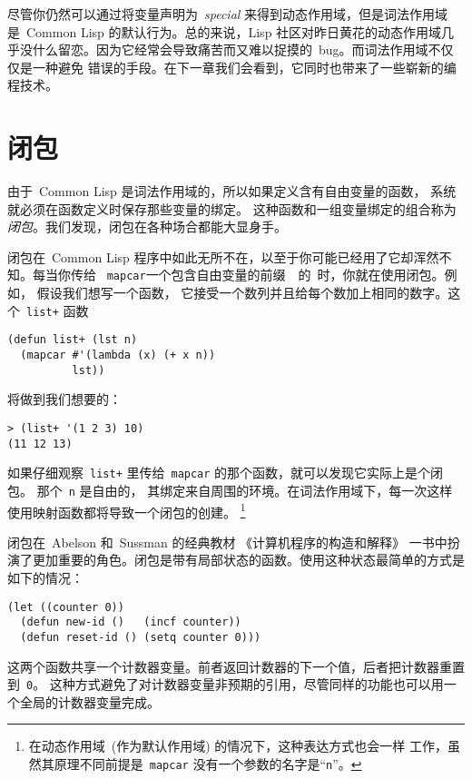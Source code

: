 尽管你仍然可以通过将变量声明为~\emph{special}
来得到动态作用域，但是词法作用域是~Common Lisp 的默认行为。总的来说，Lisp 社区对昨日黄花的动态作用域几乎没什么留恋。因为它经常会导致痛苦而又难以捉摸的~bug。而词法作用域不仅仅是一种避免
错误的手段。在下一章我们会看到，它同时也带来了一些崭新的编程技术。

\section{闭包}
\label{sec:closures}

由于~Common Lisp 是词法作用域的，所以如果定义含有自由变量的函数，
系统就必须在函数定义时保存那些变量的绑定。
这种函数和一组变量绑定的组合称为\emph{闭包}。我们发现，闭包在各种场合都能大显身手。

闭包在~Common Lisp 程序中如此无所不在，以至于你可能已经用了它却浑然不知。每当你传给
~\texttt{mapcar}一个包含自由变量的前缀~\sq~的~\lexpr 时，你就在使用闭包。例如，
假设我们想写一个函数，
它接受一个数列并且给每个数加上相同的数字。这个~\texttt{list+} 函数
\begin{lstlisting}
(defun list+ (lst n)
  (mapcar #'(lambda (x) (+ x n))
          lst))
\end{lstlisting}
将做到我们想要的：
\begin{lstlisting}
> (list+ '(1 2 3) 10)
(11 12 13)
\end{lstlisting}
如果仔细观察~\texttt{list+} 里传给~\texttt{mapcar} 的那个函数，就可以发现它实际上是个闭包。
那个~\verb|n| 是自由的，
其绑定来自周围的环境。在词法作用域下，每一次这样使用映射函数都将导致一个闭包的创建。
\footnote{在动态作用域~(作为默认作用域) 的情况下，这种表达方式也会一样
  工作，虽然其原理不同\pozhehao{}前提是~\texttt{mapcar} 没有一个参数的名字是``\texttt{n}''。}

闭包在~Abelson
和~Sussman 的经典教材
《计算机程序的构造和解释》
一书中扮演了更加重要的角色。闭包是带有局部状态的函数。使用这种状态最简单的方式是如下的情况：
\begin{lstlisting}
(let ((counter 0))
  (defun new-id ()   (incf counter))
  (defun reset-id () (setq counter 0)))
\end{lstlisting}
这两个函数共享一个计数器变量。前者返回计数器的下一个值，后者把计数器重置到~\verb|0|。
这种方式避免了对计数器变量非预期的引用，尽管同样的功能也可以用一个全局的计数器变量完成。

